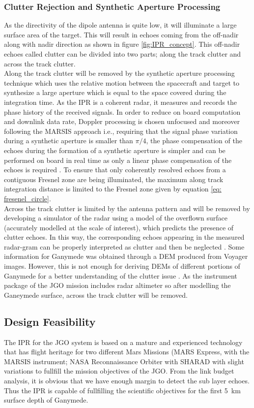\subsubsection{Clutter Rejection and Synthetic Aperture Processing}
\label{SAR}
As the directivity of the dipole antenna is quite low, it will illuminate a large surface area of the target. This will result in echoes coming from the off-nadir along with nadir direction as shown in figure \ref{fig:IPR_concept}. This off-nadir echoes called clutter can be divided into two parts; along the track clutter and across the track clutter.\\
%
Along the track clutter will be removed by the synthetic aperture processing technique which uses the relative motion between the spacecraft and target to synthesize a large aperture which is equal to the space covered during the integration time. As the \ac{IPR} is a coherent radar, it measures and records the phase history of the received signals. In order to reduce on board computation and downlink data rate, Doppler processing is chosen unfocused and moreover following the \ac{MARSIS} approach i.e., requiring that the signal phase variation during a synthetic aperture is smaller than $\pi/4$, the phase compensation of the echoes during the formation of a synthetic aperture is simpler and can be performed on board in real time as only a linear phase compensation of the echoes is required \cite{Gany_SRS}. To ensure that only coherently resolved echoes from a contiguous Fresnel zone are being illuminated, the maximum along track integration distance is limited to the Fresnel zone given by equation \ref{eq:
fresenel_circle}.
\\
Across the track clutter is limited by the antenna pattern and will be removed by developing a simulator of the radar using a model of the overflown surface (accurately modelled at the scale of interest), which predicts the presence of clutter echoes. In this way, the corresponding echoes appearing in the measured radar-gram can be properly interpreted as clutter and then be neglected \cite{SHARAD}. Some information for Ganymede was obtained through a \ac{DEM} produced from Voyager images. However, this is not enough  for deriving \acp{DEM} of different portions of Ganymede for a better understanding of the clutter issue \cite{Gany_SRS}. As the instrument package of the \ac{JGO} mission includes radar altimeter so after modelling the Ganeymede surface, across the track clutter will be removed.
%
\subsection{Design Feasibility}
The \ac{IPR} for the \ac{JGO} system is based on a mature and experienced technology that has flight heritage for two different Mars Missions (MARS Express, with the \ac{MARSIS} instrument; NASA Reconnaissance Orbiter with \ac{SHARAD} with slight variations to fullfill  the mission objectives of the \ac{JGO}. From the link budget analysis, it is obvious that we have enough margin to detect the sub layer echoes.  Thus the \ac{IPR} is capable of fullfilling the scientific objectives for the first 5~km surface depth of Ganymede.
